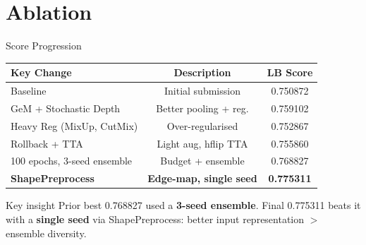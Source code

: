 \documentclass[aspectratio=169]{beamer}
\begin{document}
\section{Ablation}

\begin{frame}[t,shrink=8]{Score Progression}
  \begin{center}
    \small
    \begin{tabular}{lcc}
      \toprule
      Key Change & Description & LB Score \\
      \midrule
      Baseline                   & Initial submission           & 0.750872 \\
      GeM + Stochastic Depth     & Better pooling + reg.        & 0.759102 \\
      Heavy Reg (MixUp, CutMix)  & Over-regularised             & 0.752867 \\
      Rollback + TTA             & Light aug, hflip TTA         & 0.755860 \\
      100 epochs, 3-seed ensemble & Budget + ensemble           & 0.768827 \\
      \midrule
      \textbf{ShapePreprocess}   & \textbf{Edge-map, single seed} & \alert{\textbf{0.775311}} \\
      \bottomrule
    \end{tabular}
  \end{center}
  \smallskip
  \begin{block}{Key insight}
    \small Prior best 0.768827 used a \textbf{3-seed ensemble}.
    Final 0.775311 beats it with a \textbf{single seed} via ShapePreprocess:
    \alert{better input representation $>$ ensemble diversity}.
  \end{block}
\end{frame}
\end{document}
